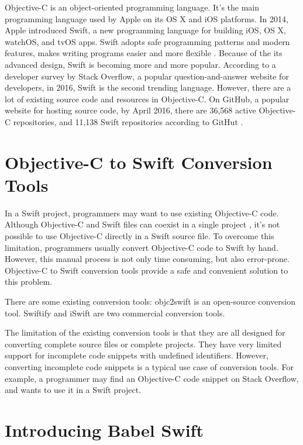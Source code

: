 \documentclass{sfuthesis}
\begin{document}
Objective-C is an object-oriented programming language. It's the main programming language used by Apple on its OS X and iOS platforms. In 2014, Apple introduced Swift, a new programming language for building iOS, OS X, watchOS, and tvOS apps. Swift adopts safe programming patterns and modern features, makes writing programs easier and more flexible \cite{aboutswift}. Because of the its advanced design, Swift is becoming more and more popular. According to a developer survey by Stack Overflow, a popular question-and-answer website for developers, in 2016, Swift is the second trending language. However, there are a lot of existing source code and resources in Objective-C. On GitHub, a popular website for hosting source code, by April 2016, there are 36,568 active Objective-C repositories, and 11,138 Swift repositories according to GitHut \cite{githut}.

\section{Objective-C to Swift Conversion Tools}

In a Swift project, programmers may want to use existing Objective-C code. Although Objective-C and Swift files can coexist in a single project \cite{swiftandobjc}, it's not possible to use Objective-C directly in a Swift source file. To overcome this limitation, programmers usually convert Objective-C code to Swift by hand. However, this manual process is not only time consuming, but also error-prone. Objective-C to Swift conversion tools provide a safe and convenient solution to this problem. 

There are some existing conversion tools: objc2swift \cite{objc2swift} is an open-source conversion tool. Swiftify \cite{swiftify} and iSwift \cite{iswift} are two commercial conversion tools.

The limitation of the existing conversion tools is that they are all designed for converting complete source files or complete projects. They have very limited support for incomplete code snippets with undefined identifiers. However, converting incomplete code snippets is a typical use case of conversion tools. For example, a programmer may find an Objective-C code snippet on Stack Overflow, and wants to use it in a Swift project.

\section{Introducing Babel Swift}
\end{document}
